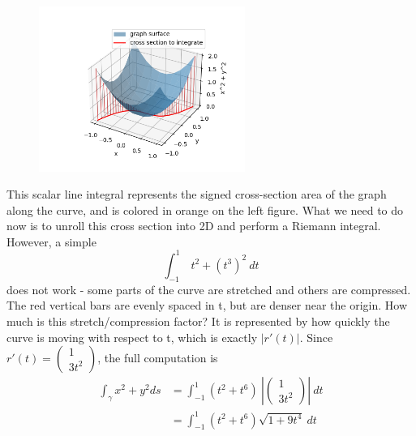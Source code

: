 \documentclass[11pt,openany]{book}
\begin{document}
	\begin{figure} 
		\centering
		\includegraphics[width=0.6\textwidth]{sin.png}
	\end{figure}
	This scalar line integral represents the signed cross-section area of the graph along the curve, and is colored in orange on the left figure.
	What we need to do now is to unroll this cross section into 2D and perform a Riemann integral. However, a simple 
	\[
		\int_{-1}^{1} \ t^2 + (t^3)^2 \ dt
	\]
	does not work - some parts of the curve are stretched and others are compressed. The red vertical bars are evenly spaced in t, but are denser near the origin. How much is this stretch/compression factor? 
	It is represented by how quickly the curve is moving with respect to t, which is exactly $|r'(t)|$.
	Since $r'(t) = \begin{pmatrix}
		1 \\ 3t^2
	\end{pmatrix}$, the full computation is
	\begin{align*}
		\int_\gamma x^2+y^2 ds &= \int_{-1}^1 (t^2+t^6)  \ \left|\begin{pmatrix}
			1 \\ 3t^2
		\end{pmatrix}\right| \ dt \\
		&= \int_{-1}^{1} (t^2+t^6) \sqrt{1+9t^4} \ dt
		\\
	\end{align*}
\end{document}
